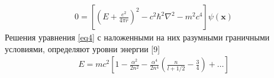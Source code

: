 \documentclass[a4paper,14pt]{article}
\theoremstyle{plain} %
\theoremstyle{definition} %
\theoremstyle{remark} %
\begin{document}
\begin{align}\label{eq4}
0=\left[\left(E+\frac{e^{2}}{4 \pi r}\right)^{2}-c^{2} \hbar^{2} \nabla^{2}-m^{2} c^{4}\right] \psi(\mathbf{x})
\end{align}
Решения уравнения \ref{eq4} с наложенными на них разумными граничными условиями, определяют уровни энергии [9]
\begin{align}\label{eq5}
E=m c^{2}\left[1-\frac{\alpha^{2}}{2 n^{2}}-\frac{\alpha^{4}}{2 n^{4}}\left(\frac{n}{l+1 / 2}-\frac{3}{4}\right)+\ldots\right]
\end{align}
\end{document}

